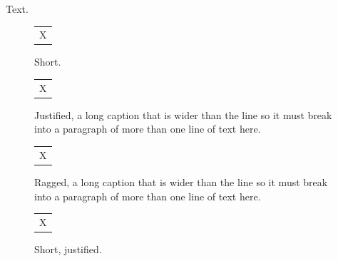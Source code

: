 \documentclass{article}
\begin{document}
Text.
\begin{figure}[h]
\centering
\begin{tabular}{c}X\end{tabular}
\caption{Short.}
\end{figure}
\begin{figure}[h]
\begin{tabular}{c}X\end{tabular}
\caption{Justified, a long caption that is wider than the line so it must break into a paragraph of more than one line of text here.}
\end{figure}
\begin{figure}[h]
\captionsetup{justification=raggedright}
\begin{tabular}{c}X\end{tabular}
\caption{Ragged, a long caption that is wider than the line so it must break into a paragraph of more than one line of text here.}
\end{figure}
\begin{figure}[h]
\captionsetup{singlelinecheck=false}
\begin{tabular}{c}X\end{tabular}
\caption{Short, justified.}
\end{figure}
\end{document}

